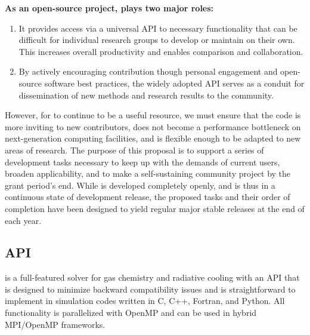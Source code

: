 \noindent
{\bf As an open-source project, \grackle{} plays two major roles:}
\begin{enumerate}
\item It provides access via a universal API to necessary functionality
that can be difficult for individual research groups to develop or
maintain on their own.  This increases overall productivity and
enables comparison and collaboration.
\item By actively encouraging contribution though personal engagement
and open-source software best practices, the widely adopted API serves
as a conduit for dissemination of new methods and research results to
the community.
\end{enumerate}
However, for \grackle{} to continue to be a useful resource, we must
ensure that the code is more inviting to new contributors, does not
become a performance bottleneck on next-generation computing facilities, 
and is flexible enough to be adapted to new areas of research.
The purpose of this proposal is to support a
series of development tasks necessary to keep up with the demands of
current users, broaden
applicability, and to make \grackle{} a
self-sustaining community project by the grant period's end.  While
\grackle{} is developed completely openly, and
is thus in a continuous state of development release, the proposed
tasks and their order of completion have been designed to yield
regular major stable releases at the end of each year.

\subsection{\grackle{} API}\label{sec:arch}

\grackle{} is a full-featured solver for gas chemistry and radiative
cooling with an API that is designed to minimize backward
compatibility issues and is straightforward to implement in simulation
codes written in C, C++, Fortran, and Python.  All functionality is
parallelized with OpenMP and can be used in hybrid MPI/OpenMP
frameworks.

